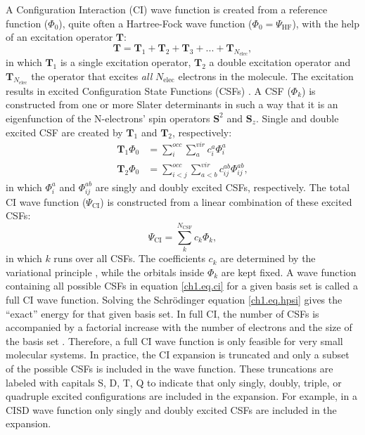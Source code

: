 A Configuration Interaction (CI) wave function is created from a reference function ($\Phi_0$), quite often a Hartree-Fock wave function ($\Phi_0 = \Psi_\mathrm{HF}$), with the help of an excitation operator $\mathbf{T}$:
\begin{equation}
\mathbf{T}=\mathbf{T}_1 + \mathbf{T}_2 + \mathbf{T}_3 + ... + \mathbf{T}_{N_{\mathrm{elec}}},
\label{ch1.eq.ciexcitation}
\end{equation}
in which $\mathbf{T}_1$ is a single excitation operator, $\mathbf{T}_2$ a double excitation operator and $\mathbf{T}_{N_{\mathrm{elec}}}$ the operator that excites \textit{all} $N_{\mathrm{elec}}$ electrons in the molecule. The excitation results in excited Configuration State Functions (CSFs) \cite{shavitt1,shavitt2}. A CSF ($\Phi_k$) is constructed from one or more Slater determinants in such a way that it is an eigenfunction of the N-electrons' spin operators $\mathbf{S}^2$ and $\mathbf{S}_z$. Single and double excited CSF are created by $\mathbf{T}_1$ and $\mathbf{T}_2$, respectively:
\begin{equation}
\begin{split}
\mathbf{T}_1 \Phi_0 & = \sum_i^{occ} \sum_a^{vir} c_i^a \Phi_i^a \\
\mathbf{T}_2 \Phi_0 & = \sum_{i<j}^{occ} \sum_{a<b}^{vir} c_{ij}^{ab} \Phi_{ij}^{ab},
\end{split}
\label{ch1.eq.ciexcited}
\end{equation}
in which $\Phi_i^a$ and $\Phi_{ij}^{ab}$ are singly and doubly excited CSFs, respectively. The total CI wave function ($\Psi_{\mathrm{CI}}$) is constructed from a linear combination of these excited CSFs:
\begin{equation}
\Psi_{\mathrm{CI}} = \sum_{k}^{N_{\mathrm{CSF}}} c_k \Phi_k,
\label{ch1.eq.ci}
\end{equation}
in which $k$ runs over all CSFs. The coefficients $c_k$ are determined by the variational principle \cite{varia}, while the orbitals inside $\Phi_k$ are kept fixed. A wave function containing all possible CSFs in equation \ref{ch1.eq.ci} for a given basis set is called a full CI wave function. Solving the Schr\"{o}dinger equation \ref{ch1.eq.hpsi} gives the ``exact'' energy for that given basis set. In full CI, the number of CSFs is accompanied by a factorial increase with the number of electrons and the size of the basis set \cite{weyl}. Therefore, a full CI wave function is only feasible for very small molecular systems. In practice, the CI expansion is truncated and only a subset of the possible CSFs is included in the wave function. These truncations are labeled with capitals S, D, T, Q to indicate that only singly, doubly, triple, or quadruple excited configurations are included in the expansion. For example, in a CISD wave function only singly and doubly excited CSFs are included in the expansion.

